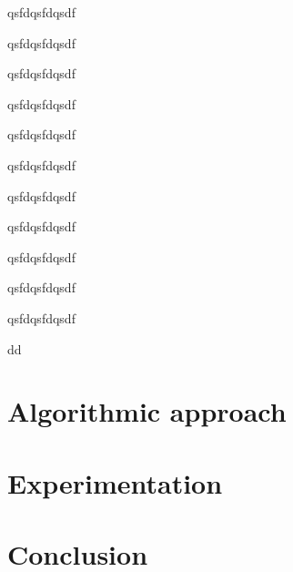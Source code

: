 \documentclass{article}
\begin{document}
qsfdqsfdqsdf


qsfdqsfdqsdf


qsfdqsfdqsdf


qsfdqsfdqsdf


qsfdqsfdqsdf


qsfdqsfdqsdf


qsfdqsfdqsdf


qsfdqsfdqsdf


qsfdqsfdqsdf


qsfdqsfdqsdf


qsfdqsfdqsdf


dd

\section{Algorithmic approach}

\section{Experimentation}

\section{Conclusion}
\end{document}
